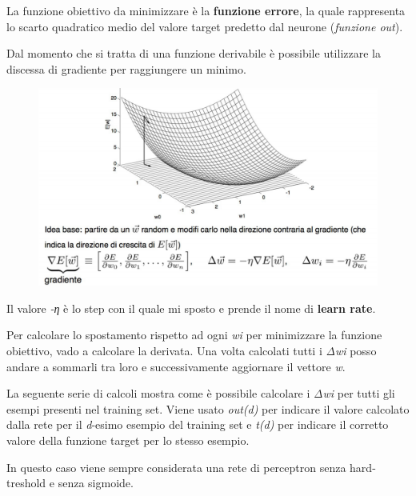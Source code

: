 La funzione obiettivo da minimizzare è la \textbf{funzione errore}, la
quale rappresenta lo scarto quadratico medio del valore target predetto
dal neurone (\emph{funzione out}).

Dal momento che si tratta di una funzione derivabile è possibile
utilizzare la discessa di gradiente per raggiungere un minimo.

\begin{figure}[htbp]
\centering
\includegraphics{./notes/immagini/l10-step.png}
\caption{}
\end{figure}

Il valore \emph{-η} è lo step con il quale mi sposto e prende il nome di
\textbf{learn rate}.

Per calcolare lo spostamento rispetto ad ogni \emph{wi} per minimizzare
la funzione obiettivo, vado a calcolare la derivata. Una volta calcolati
tutti i \emph{Δwi} posso andare a sommarli tra loro e successivamente
aggiornare il vettore \emph{w}.

La seguente serie di calcoli mostra come è possibile calcolare i
\emph{Δwi} per tutti gli esempi presenti nel training set. Viene usato
\emph{out(d)} per indicare il valore calcolato dalla rete per il
\emph{d}-esimo esempio del training set e \emph{t(d)} per indicare il
corretto valore della funzione target per lo stesso esempio.

In questo caso viene sempre considerata una rete di perceptron senza
hard-treshold e senza sigmoide.

